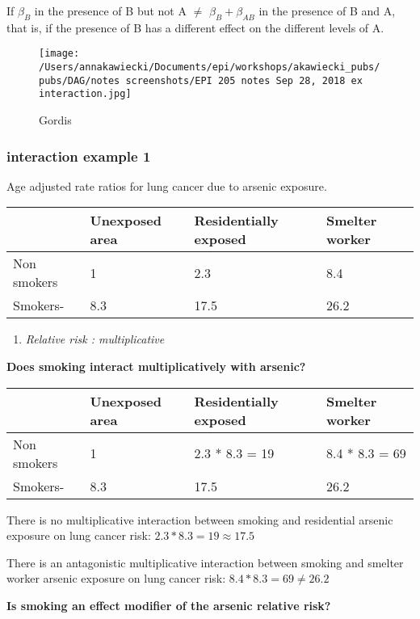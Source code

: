 \documentclass[
]{article}
\providecommand{\tightlist}{%
  \setlength{\itemsep}{0pt}\setlength{\parskip}{0pt}}
\begin{document}
If \(\beta_B\) in the presence of B but not A \(\ne\)
\(\beta_B+ \beta_{AB}\) in the presence of B and A, that is, if the
presence of B has a different effect on the different levels of A.

\begin{figure}
\centering
\texttt{[image: /Users/annakawiecki/Documents/epi/workshops/akawiecki\_pubs/pubs/DAG/notes screenshots/EPI 205 notes Sep 28, 2018 ex interaction.jpg]}
\caption{Gordis}
\end{figure}

\hypertarget{interaction-example-1}{%
\subsubsection{interaction example 1}\label{interaction-example-1}}

Age adjusted rate ratios for lung cancer due to arsenic exposure.

\begin{longtable}[]{@{}llll@{}}
\toprule
& Unexposed area & Residentially exposed & Smelter worker\tabularnewline
\midrule
\endhead
Non smokers & 1 & 2.3 & 8.4\tabularnewline
Smokers- & 8.3 & 17.5 & 26.2\tabularnewline
\bottomrule
\end{longtable}

\begin{enumerate}
\def\labelenumi{\arabic{enumi}.}
\tightlist
\item
  \emph{Relative risk : multiplicative}
\end{enumerate}

\textbf{Does smoking interact multiplicatively with arsenic?}

\begin{longtable}[]{@{}llll@{}}
\toprule
& Unexposed area & Residentially exposed & Smelter worker\tabularnewline
\midrule
\endhead
Non smokers & 1 & 2.3 * 8.3 = 19 & 8.4 * 8.3 = 69\tabularnewline
Smokers- & 8.3 & 17.5 & 26.2\tabularnewline
\bottomrule
\end{longtable}

There is no multiplicative interaction between smoking and residential
arsenic exposure on lung cancer risk: \(2.3 * 8.3 = 19 \approx 17.5\)

There is an antagonistic multiplicative interaction between smoking and
smelter worker arsenic exposure on lung cancer risk:
\(8.4 * 8.3 = 69 \ne 26.2\)

\textbf{Is smoking an effect modifier of the arsenic relative risk?}
\end{document}
